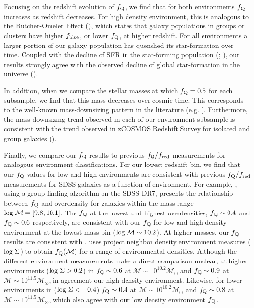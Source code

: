 \documentclass{emulateapj}
\begin{document}
Focusing on the redshift evolution of $f_{\rm{Q}}$, we find that for both environments $f_{\rm{Q}}$ increases as redshift decreases. For high density environment, this is analogous to the Butcher-Omeler Effect (\cite{Butcher:1984aa}), which states that galaxy populations in groups or clusters have higher $f_{\rm{blue}}$, or lower $f_{\rm{Q}}$, at higher redshift. For all environments a larger portion of our galaxy population has quenched its star-formation over time. Coupled with the decline of SFR in the star-forming population (\cite{Noeske:2007aa}; \cite{cooper08a}), our results strongly agree with the observed decline of global star-formation in the universe (\cite{hopkins06a}). %

In addition, when we compare the stellar masses at which $f_{\rm{Q}} = 0.5$ for each subsample, we find that this mass decreases over cosmic time. This corresponds to the well-known mass-downsizing pattern in the literature (e.g. \cite{bundy06a}). Furthermore, the mass-downsizing trend observed in each of our environment subsample is consistent with the trend observed in zCOSMOS Redshift Survey for isolated and group galaxies (\cite{Iovino:2010aa}). %

Finally, we compare our $f_{\rm{Q}}$ results to previous $f_{\rm{Q}}/f_{\rm{red}}$ measurements for analogous environment classifications. For our lowest redshift bin, we find that our $f_{\rm{Q}}$ values for low and high environments are consistent with previous $f_{\rm{Q}}/f_{\rm{red}}$ measurements for SDSS galaxies as a function of environment. For example, \cite{Tinker:2011aa}, using a group-finding algorithm on the SDSS DR7, presents the relationship between $f_{\rm{Q}}$ and overdensity for galaxies within the mass range $\rm{log} \; \mathcal{M} = [9.8, 10.1]$. The \cite{Tinker:2011aa} $f_{\rm{Q}}$ at the lowest and highest overdensities, $f_{\rm{Q}} \sim 0.4$ and $f_{\rm{Q}} \sim 0.6$ respectively, are consistent with our $f_{\rm{Q}}$ for low and high density environment at the lowest mass bin ($\rm{log} \; \mathcal{M} \sim 10.2$). At higher masses, our $f_{\rm{Q}}$ results are consistent with \cite{Baldry:2006aa}. \cite{Baldry:2006aa} uses project neighbor density environment measures ($\rm{log} \;  \Sigma$) to obtain $f_{\rm{Q}}(\mathcal{M})$ for a range of environmental densities. Although the different environment measurements make a direct comparison unclear, at higher environments ($\rm{log} \; \Sigma > 0.2$) in \cite{Baldry:2006aa} $f_{\rm{Q}} \sim 0.6$ at $\mathcal{M} \sim 10^{10.2} \mathcal{M}_{\odot}$ and $f_{\rm{Q}} \sim 0.9$ at $\mathcal{M} \sim 10^{11.5} \mathcal{M}_{\odot}$, in agreement our high density environment. Likewise, for lower environments in \cite{Baldry:2006aa} ($\rm{log} \; \Sigma < -0.4$) $f_{\rm{Q}} \sim 0.4$ at $\mathcal{M} \sim 10^{10.2} \mathcal{M}_{\odot}$ and $f_{\rm{Q}} \sim 0.8$ at $\mathcal{M} \sim 10^{11.5} \mathcal{M}_{\odot}$, which also agree with our low density environment $f_{\rm{Q}}$. 
\end{document}
